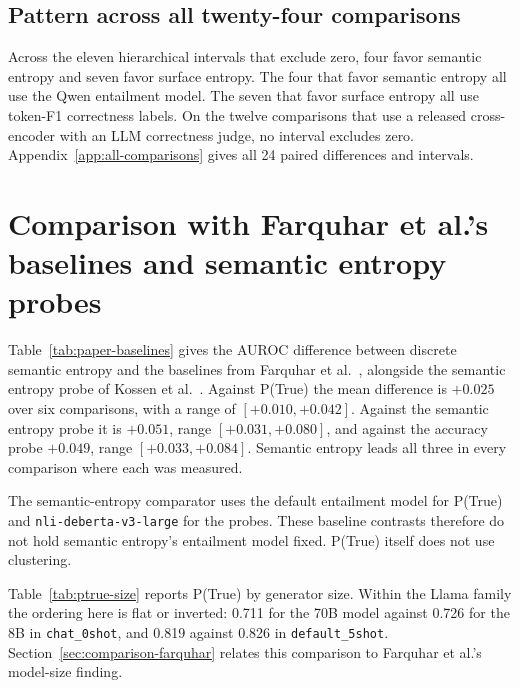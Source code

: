 

\subsection{Pattern across all twenty-four comparisons}

Across the eleven hierarchical intervals that exclude zero, four favor
semantic entropy and seven favor surface entropy. The four that favor semantic
entropy all use the Qwen entailment model. The seven that favor surface
entropy all use token-F1 correctness labels. On the twelve comparisons that use
a released cross-encoder with an LLM correctness judge, no interval excludes
zero. Appendix~\ref{app:all-comparisons} gives all 24 paired differences and
intervals.

\section{Comparison with Farquhar et al.'s baselines and semantic entropy probes}
\label{sec:paper-baselines}

Table~\ref{tab:paper-baselines} gives the AUROC difference between discrete
semantic entropy and the baselines from Farquhar et al.~\cite{semantic_entropy_nature_2024},
alongside the semantic entropy probe of Kossen et al.~\cite{kossen_semantic_entropy_probes_2024}. Against
P(True) the mean difference is $+0.025$ over six comparisons, with a range of
$[+0.010, +0.042]$. Against the semantic
entropy probe it is $+0.051$, range $[+0.031, +0.080]$, and against the
accuracy probe $+0.049$, range $[+0.033, +0.084]$. Semantic entropy leads all
three in every comparison where each was measured.



The semantic-entropy comparator uses the default entailment model for P(True)
and \texttt{nli-deberta-v3-large} for the probes. These baseline contrasts
therefore do not hold semantic entropy's entailment model fixed. P(True)
itself does not use clustering.

Table~\ref{tab:ptrue-size} reports P(True) by generator size. Within the Llama
family the ordering here is flat or inverted: 0.711 for the 70B model against
0.726 for the 8B in \texttt{chat\_0shot}, and 0.819 against 0.826 in
\texttt{default\_5shot}. Section~\ref{sec:comparison-farquhar} relates this
comparison to Farquhar et al.'s model-size finding.



